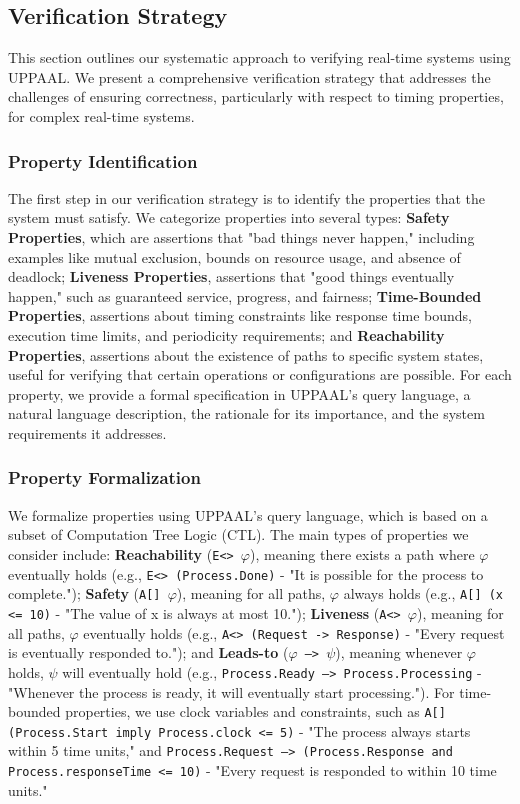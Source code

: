 \subsection{Verification Strategy}
This section outlines our systematic approach to verifying real-time systems using UPPAAL. We present a comprehensive verification strategy that addresses the challenges of ensuring correctness, particularly with respect to timing properties, for complex real-time systems.

\subsubsection{Property Identification}
The first step in our verification strategy is to identify the properties that the system must satisfy. We categorize properties into several types: \textbf{Safety Properties}, which are assertions that "bad things never happen," including examples like mutual exclusion, bounds on resource usage, and absence of deadlock; \textbf{Liveness Properties}, assertions that "good things eventually happen," such as guaranteed service, progress, and fairness; \textbf{Time-Bounded Properties}, assertions about timing constraints like response time bounds, execution time limits, and periodicity requirements; and \textbf{Reachability Properties}, assertions about the existence of paths to specific system states, useful for verifying that certain operations or configurations are possible. For each property, we provide a formal specification in UPPAAL's query language, a natural language description, the rationale for its importance, and the system requirements it addresses.

\subsubsection{Property Formalization}
We formalize properties using UPPAAL's query language, which is based on a subset of Computation Tree Logic (CTL). The main types of properties we consider include: \textbf{Reachability} (\texttt{E<> $\varphi$}), meaning there exists a path where $\varphi$ eventually holds (e.g., \texttt{E<> (Process.Done)} - "It is possible for the process to complete."); \textbf{Safety} (\texttt{A[] $\varphi$}), meaning for all paths, $\varphi$ always holds (e.g., \texttt{A[] (x <= 10)} - "The value of x is always at most 10."); \textbf{Liveness} (\texttt{A<> $\varphi$}), meaning for all paths, $\varphi$ eventually holds (e.g., \texttt{A<> (Request -> Response)} - "Every request is eventually responded to."); and \textbf{Leads-to} (\texttt{$\varphi$ --> $\psi$}), meaning whenever $\varphi$ holds, $\psi$ will eventually hold (e.g., \texttt{Process.Ready --> Process.Processing} - "Whenever the process is ready, it will eventually start processing."). For time-bounded properties, we use clock variables and constraints, such as \texttt{A[] (Process.Start imply Process.clock <= 5)} - "The process always starts within 5 time units," and \texttt{Process.Request --> (Process.Response and Process.responseTime <= 10)} - "Every request is responded to within 10 time units."


